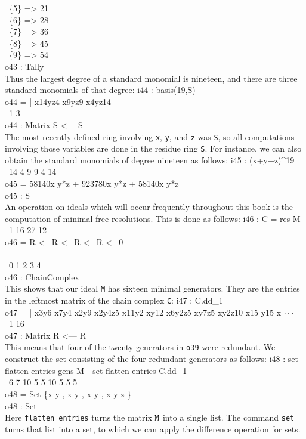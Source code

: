\            \{5\} => 21\\
\            \{6\} => 28\\
\            \{7\} => 36\\
\            \{8\} => 45\\
\            \{9\} => 54\\
\emptyLine
o43 : Tally\\
\endOutput
Thus the largest degree of a standard monomial is nineteen,
and there are three standard monomials of that degree:
\beginOutput
i44 : basis(19,S)\\
\emptyLine
o44 = | x14yz4 x9yz9 x4yz14 |\\
\emptyLine
\              1       3\\
o44 : Matrix S  <--- S\\
\endOutput
The most recently defined ring involving {\tt x}, {\tt y}, and {\tt z} was
{\tt S}, so all computations involving those variables are done in the
residue ring {\tt S}.
For instance, we can also obtain the
standard monomials of  degree nineteen as follows:
\beginOutput
i45 : (x+y+z)^19\\
\emptyLine
\            14   4          9   9         4   14\\
o45 = 58140x  y*z  + 923780x y*z  + 58140x y*z\\
\emptyLine
o45 : S\\
\endOutput
An operation on ideals which will occur frequently throughout this
book is the computation of minimal free resolutions. This is done as follows:
\beginOutput
i46 : C = res M\\
\emptyLine
\       1      16      27      12\\
o46 = R  <-- R   <-- R   <-- R   <-- 0\\
\                                      \\
\      0      1       2       3       4\\
\emptyLine
o46 : ChainComplex\\
\endOutput
This shows that our ideal {\tt M} has sixteen minimal generators.
They are the entries in the leftmost matrix of the chain complex {\tt C}:
\beginOutput
i47 : C.dd_1\\
\emptyLine
o47 = | x3y6 x7y4 x2y9 x2y4z5 x11y2 xy12 x6y2z5 xy7z5 xy2z10 x15 y15 x $\cdot\cdot\cdot$\\
\emptyLine
\              1       16\\
o47 : Matrix R  <--- R\\
\endOutput
This means that four of the twenty generators in {\tt o39} were redundant.
We construct the set consisting of the four redundant generators
as follows:
\beginOutput
i48 : set flatten entries gens M - set flatten entries C.dd_1\\
\emptyLine
\            6 7   10 5   5 10   5 5 5\\
o48 = Set \{x y , x  y , x y  , x y z \}\\
\emptyLine
o48 : Set\\
\endOutput
Here {\tt flatten entries} turns the matrix ${\tt M}$ into a single list.
The command {\tt set} turns that list into a set, to which we
can apply the difference operation for sets.

